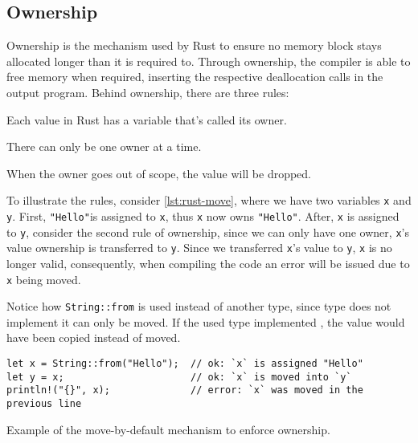 \subsection{Ownership}\label{sec:rust-lang:ownership}

Ownership is the mechanism used by Rust to ensure no memory block stays allocated longer than it is required to.
Through ownership, the compiler is able to free memory when required,
inserting the respective deallocation calls in the output program.
Behind ownership, there are three rules:

\begin{displayquote}
    \begin{compactitem}
        \item Each value in Rust has a variable that’s called its owner.
        \item There can only be one owner at a time.
        \item When the owner goes out of scope, the value will be dropped.
    \end{compactitem}
\end{displayquote}

To illustrate the rules, consider \autoref{lst:rust-move}, where we have two variables \texttt{x} and \texttt{y}.
First, \texttt{"Hello"}\footnotemark is assigned to \texttt{x}, thus \texttt{x} now owns \texttt{"Hello"}.
After, \texttt{x} is assigned to \texttt{y}, consider the second rule of ownership, since we can only have one owner,
\texttt{x}'s value ownership is transferred to \texttt{y}.
Since we transferred \texttt{x}'s value to \texttt{y}, \texttt{x} is no longer valid, consequently,
when compiling the code an error will be issued due to \texttt{x} being moved.

Notice how \texttt{String::from} is used instead of another type,
since  type does not implement  it can only be moved.
If the used type implemented , the value would have been copied instead of moved.

\begin{listing}
    \begin{verbatim}
let x = String::from("Hello");  // ok: `x` is assigned "Hello"
let y = x;                      // ok: `x` is moved into `y`
println!("{}", x);              // error: `x` was moved in the previous line
    \end{verbatim}
    \caption{Example of the move-by-default mechanism to enforce ownership.}
    \label{lst:rust-move}
\end{listing}

